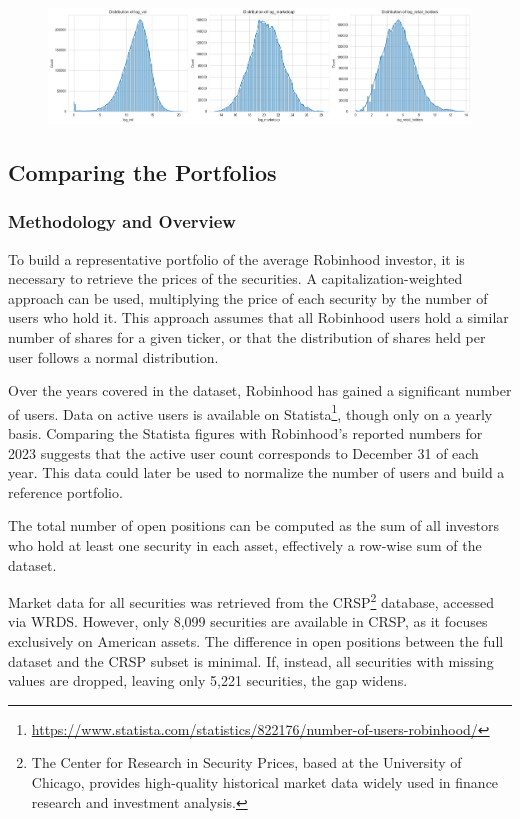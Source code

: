 \begin{figure}[h!]
    \centering
    \includegraphics[width=1\linewidth]{../images/Distributions.png}
\end{figure}












\subsection{Comparing the Portfolios}
\subsubsection{Methodology and Overview} 
To build a representative portfolio of the average Robinhood investor, it is necessary to retrieve the prices of the securities. A capitalization-weighted approach can be used, multiplying the price of each security by the number of users who hold it. This approach assumes that all Robinhood users hold a similar number of shares for a given ticker, or that the distribution of shares held per user follows a normal distribution.  

Over the years covered in the dataset, Robinhood has gained a significant number of users. Data on active users is available on Statista\footnote{\url{https://www.statista.com/statistics/822176/number-of-users-robinhood/}}, though only on a yearly basis. Comparing the Statista figures with Robinhood's reported numbers for 2023 suggests that the active user count corresponds to December 31 of each year. This data could later be used to normalize the number of users and build a reference portfolio.  

The total number of open positions can be computed as the sum of all investors who hold at least one security in each asset, effectively a row-wise sum of the dataset.  

Market data for all securities was retrieved from the CRSP\footnote{The Center for Research in Security Prices, based at the University of Chicago, provides high-quality historical market data widely used in finance research and investment analysis.} database, accessed via WRDS. However, only 8,099 securities are available in CRSP, as it focuses exclusively on American assets. The difference in open positions between the full dataset and the CRSP subset is minimal. If, instead, all securities with missing values are dropped, leaving only 5,221 securities, the gap widens.

